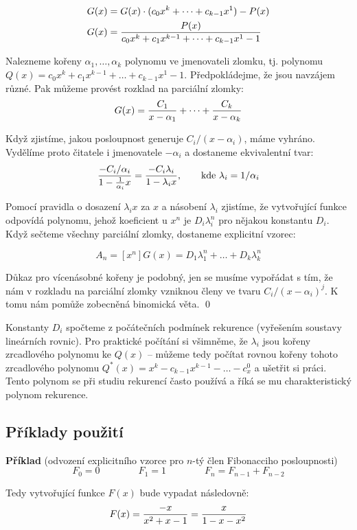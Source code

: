 \begin{align}
G(x) &= G(x)\cdot(c_0x^k + \dots + c_{k-1}x^1) - P(x) \\
G(x) &= {P(x)\over c_0x^k+c_1x^{k-1}+\dots +c_{k-1}x^1-1}
\end{align}

Nalezneme kořeny $\alpha_1, \dots, \alpha_k$ polynomu ve jmenovateli zlomku,
tj. polynomu $Q(x) = c_0x^k+c_1x^{k-1}+\dots +c_{k-1}x^1-1$. Předpokládejme,
že jsou navzájem různé. Pak můžeme provést rozklad na parciální zlomky:
$$G(x) = {C_1\over x-\alpha_1} + \dots + {C_k\over x-\alpha_k}$$

Když zjistíme, jakou posloupnost generuje $C_i/(x-\alpha_i)$, máme
vyhráno. Vydělíme proto čitatele i jmenovatele $-\alpha_i$ a dostaneme
ekvivalentní tvar:
$${-C_i/\alpha_i\over1-{1\over\alpha_i}x} = {-C_i\lambda_i\over 1-\lambda_ix},\qquad\text{kde}~\lambda_i = 1/\alpha_i$$

Pomocí pravidla o dosazení $\lambda_ix$ za $x$ a násobení $\lambda_i$
zjistíme, že vytvořující funkce odpovídá polynomu, jehož koeficient u $x^n$
je $D_i\lambda_i^n$ pro nějakou konstantu $D_i$. Když sečteme všechny parciální zlomky, dostaneme explicitní vzorec:

$$A_n = [x^n]G(x) = D_1\lambda_1^n + \dots + D_k\lambda_k^n$$

Důkaz pro vícenásobné kořeny je podobný, jen se musíme vypořádat s tím, že nám
v rozkladu na parciální zlomky vzniknou členy ve tvaru $C_i/(x-\alpha_i)^j$. K
tomu nám pomůže zobecněná binomická věta.
\qed

Konstanty $D_i$ spočteme z počátečních podmínek rekurence (vyřešením soustavy
lineárních rovnic). Pro praktické počítání si všimněme, že $\lambda_i$ jsou
kořeny zrcadlového polynomu ke $Q(x)$ -- můžeme tedy počítat rovnou kořeny
tohoto zrcadlového polynomu $Q^*(x) = x^k-c_{k-1}x^{k-1}-\dots-c_x^0$ a ušetřit
si práci. Tento polynom se při studiu rekurencí často používá a říká se mu
charakteristický polynom rekurence.

\subsection{Příklady použití}
\noindent\textbf{Příklad} (odvození explicitního vzorce pro $n$-tý člen Fibonacciho posloupnosti)
$$F_0 = 0\qquad\qquad F_1 = 1\qquad\qquad F_n = F_{n-1} + F_{n-2}$$

Tedy vytvořující funkce $F(x)$ bude vypadat následovně:
$$F(x) = {-x\over x^2+x-1} = {x\over 1-x-x^2}$$

